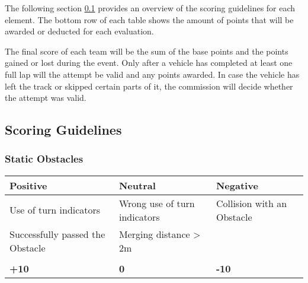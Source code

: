 {	The following section \ref{obstacle_scoring_guidelines} provides an overview of
	the scoring guidelines for each element. The bottom row of each table shows the
	amount of points that will be awarded or deducted for each evaluation.

	The final score of each team will be the sum of the base points and the points
	gained or lost during the event. Only after a vehicle has completed at least
	one full lap will the attempt be valid and any points awarded. In case the
	vehicle has left the track or skipped certain parts of it, the commission will
	decide whether the attempt was valid.

	\subsection{Scoring Guidelines}
	\label{obstacle_scoring_guidelines}

	\subsubsection*{Static Obstacles}
	\begin{table}[H]
		\begin{tabularx}{\textwidth}{XXX}
			\toprule
			\textbf{Positive}                & \textbf{Neutral}             & \textbf{Negative}          \\
			\midrule
			Use of turn indicators           & Wrong use of turn indicators & Collision with an Obstacle \\
			Successfully passed the Obstacle & Merging distance > 2m        &                            \\
			                                 &                              &                            \\
			\topstrut
			\textbf{+10}                     & \textbf{0}                   & \textbf{-10}               \\
			\bottomrule
		\end{tabularx}
	\end{table}

}
